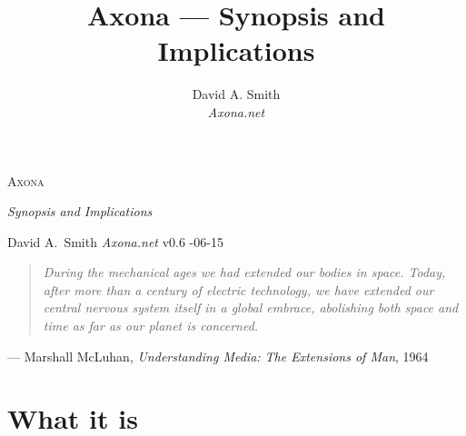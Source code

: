 \documentclass[nobib]{tufte-handout}
\title{Axona — Synopsis and Implications}
\author[David A. Smith]{David A. Smith \\[0.3em] \emph{\small Axona.net}}
\date{}
\begin{document}
\pagestyle{axonaplain}

\begin{center}
{\fontsize{34}{38}\selectfont \textsc{Axona}\par}
\vspace{0.35em}
{\Large\itshape Synopsis and Implications\par}
\vspace{0.5em}
{\small David A.~Smith \quad\textperiodcentered\quad \emph{Axona.net} \quad\textperiodcentered\quad v0.6 \quad\textperiodcentered{}-06-15\par}
\end{center}

\vspace{0.4em}
\noindent\begin{quote}
\itshape\color{inkmuted}
During the mechanical ages we had extended our bodies in space. Today, after
more than a century of electric technology, we have extended our central
nervous system itself in a global embrace, abolishing both space and time as
far as our planet is concerned.
\end{quote}
\vspace{-0.3em}
\hfill{\small\color{inkmuted}--- Marshall McLuhan, \emph{Understanding Media:
The Extensions of Man}, 1964}
\vspace{0.6em}

\section*{What it is}
\end{document}
